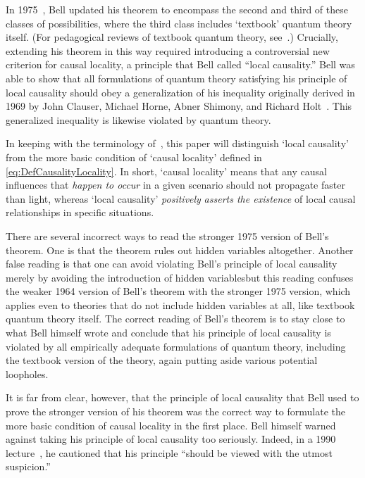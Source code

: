\documentclass[twoside,twocolumn,english,prl,superscriptaddress,nobibnotes,nofootinbib]{revtex4-2}
\begin{document}
In 1975~\citep{Bell:1975ttolb}, Bell updated his theorem to encompass
the second and third of these classes of possibilities, where the
third class includes \textquoteleft textbook\textquoteright{} quantum
theory itself. (For pedagogical reviews of textbook quantum theory,
see~\citep{Sakurai:1993mqm,Shankar:1994pqm,GriffithsSchroeter:2018iqm}.)
Crucially, extending his theorem in this way required introducing
a controversial new criterion for causal locality, a principle that
Bell called ``local causality.'' Bell was able to show that all
formulations of quantum theory satisfying his principle of local causality
should obey a generalization of his inequality originally derived
in 1969 by John Clauser, Michael Horne, Abner Shimony, and Richard
Holt~\citep{ClauserHorneShimonyHolt:1969pettlhvt}. This generalized
inequality is likewise violated by quantum theory.

In keeping with the terminology of~\citep{MyrvoldGenoveseShimony:2024bst},
this paper will distinguish \textquoteleft local causality\textquoteright{}
from the more basic condition of \textquoteleft causal locality\textquoteright{}
defined in \eqref{eq:DefCausalityLocality}. In short, \textquoteleft causal
locality\textquoteright{} means that any causal influences that \emph{happen
to occur} in a given scenario should not propagate faster than light,
whereas \textquoteleft local causality\textquoteright{} \emph{positively}
\emph{asserts the existence} of local causal relationships in specific
situations.

There are several incorrect ways to read the stronger 1975 version
of Bell's theorem. One is that the theorem rules out hidden variables
altogether. Another false reading is that one can avoid violating
Bell's principle of local causality merely by avoiding the introduction
of hidden variables\textemdash but this reading confuses the weaker
1964 version of Bell's theorem with the stronger 1975 version, which
applies even to theories that do not include hidden variables at all,
like textbook quantum theory itself. The correct reading of Bell's
theorem is to stay close to what Bell himself wrote and conclude that
his principle of local causality is violated by all empirically adequate
formulations of quantum theory, including the textbook version of
the theory, again putting aside various potential loopholes.

It is far from clear, however, that the principle of local causality
that Bell used to prove the stronger version of his theorem was the
correct way to formulate the more basic condition of causal locality
in the first place. Bell himself warned against taking his principle
of local causality too seriously. Indeed, in a 1990 lecture~\citep{Bell:1990lnc},
he cautioned that his principle ``should be viewed with the utmost
suspicion.''
\end{document}
